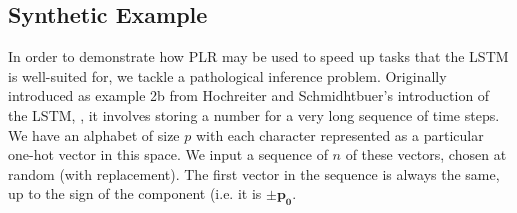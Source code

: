 \documentclass{article}
\begin{document}


\subsection{Synthetic Example}
In order to demonstrate how PLR may be used to speed up tasks that the LSTM is
well-suited for, we tackle a pathological inference problem. Originally
introduced as example 2b from Hochreiter and Schmidhtbuer's introduction of the
LSTM, \cite{hochreiter1997long}, it involves storing a number for a very long
sequence of time steps. We have an alphabet of size \(p\) with each character
represented as a particular one-hot vector in this space. We input a sequence of
\(n\) of these vectors, chosen at random (with replacement). The first vector in
the sequence is always the same, up to the sign of the component (i.e. it is \(\pm
\boldsymbol{p_0} \).
\end{document}
